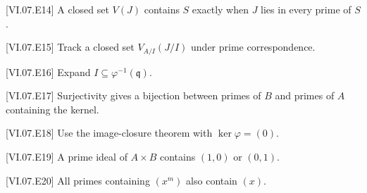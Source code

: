 \begin{hint}
[VI.07.E14]
A closed set $V(J)$ contains $S$ exactly when $J$ lies in every prime of $S$.
\end{hint}
\begin{hint}
[VI.07.E15]
Track a closed set $V_{A/I}(J/I)$ under prime correspondence.
\end{hint}
\begin{hint}
[VI.07.E16]
Expand $I\subseteq\varphi^{-1}(\mathfrak q)$.
\end{hint}
\begin{hint}
[VI.07.E17]
Surjectivity gives a bijection between primes of $B$ and primes of $A$ containing the kernel.
\end{hint}
\begin{hint}
[VI.07.E18]
Use the image-closure theorem with $\ker\varphi=(0)$.
\end{hint}
\begin{hint}
[VI.07.E19]
A prime ideal of $A\times B$ contains $(1,0)$ or $(0,1)$.
\end{hint}
\begin{hint}
[VI.07.E20]
All primes containing $(x^m)$ also contain $(x)$.
\end{hint}
